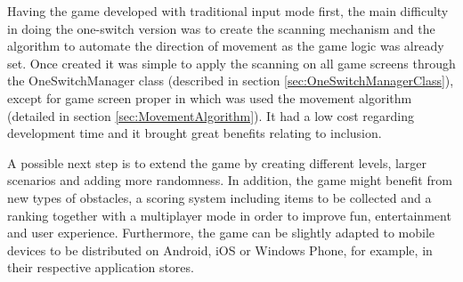 \documentclass[a4paper]{sbgames}               %
\begin{document}
Having the game developed with traditional input mode first, the main difficulty in doing the one-switch version was to create the scanning mechanism and the algorithm to automate the direction of movement as the game logic was already set. Once created it was simple to apply the scanning on all game screens through the OneSwitchManager class (described in section \ref{sec:OneSwitchManagerClass}), except for game screen proper in which was used the movement algorithm (detailed in section \ref{sec:MovementAlgorithm}). It had a low cost regarding development time and it brought great benefits relating to inclusion.

A possible next step is to extend the game by creating different levels, larger scenarios and adding more randomness. In addition, the game might benefit from new types of obstacles, a scoring system including items to be collected and a ranking together with a multiplayer mode in order to improve fun, entertainment and user experience. Furthermore, the game can be slightly adapted to mobile devices to be distributed on Android, iOS or Windows Phone, for example, in their respective application stores.




\end{document}
